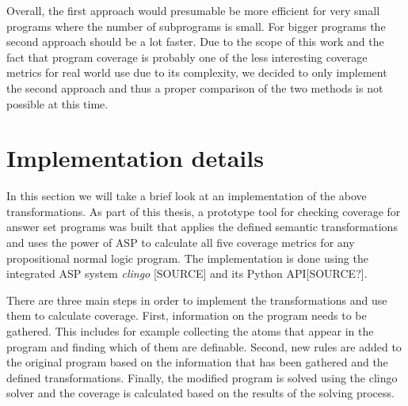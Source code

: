Overall, the first approach would presumable be more efficient for very small programs where the number of subprograms is small. For bigger programs the second approach should be a lot faster. Due to the scope of this work and the fact that program coverage is probably one of the less interesting coverage metrics for real world use due to its complexity, we decided to only implement the second approach and thus a proper comparison of the two methods is not possible at this time.

\begin{comment}
- use the $\_ri$ labels from rule coverage, no new labels needed!   \/

- a subprogram $P' \subseteq P$ is covered if exactly all rules contained in $P'$ are covered and no other rules are covered        \/

- two ways to go about computing it!    \/

-> each answer set covers exactly one subprogram -> it is necessary to look at every answer set instead of just brave/cautious like with the other coverage metrics -> has to be computed seperately from the other coverage metrics!       \/

- for $P = \{r_1,...,r_n\}$,  $\{\_rx,...,\_ry\}$ are the rule labels in an answer set <=> $P'=\{r_x,...,r_y\}$ is covered      \/
\end{comment}

\section{Implementation details}
\label{sec:Computing coverage metrics for propositional programs/Implementation details}
In this section we will take a brief look at an implementation of the above transformations. As part of this thesis, a prototype tool for checking coverage for answer set programs was built that applies the defined semantic transformations and uses the power of ASP to calculate all five coverage metrics for any propositional normal logic program. The implementation is done using the integrated ASP system \emph{clingo} [SOURCE] and its Python API[SOURCE?]. 

There are three main steps in order to implement the transformations and use them to calculate coverage. First, information on the program needs to be gathered. This includes for example collecting the atoms that appear in the program and finding which of them are definable. Second, new rules are added to the original program based on the information that has been gathered and the defined transformations. Finally, the modified program is solved using the clingo solver and the coverage is calculated based on the results of the solving process.

